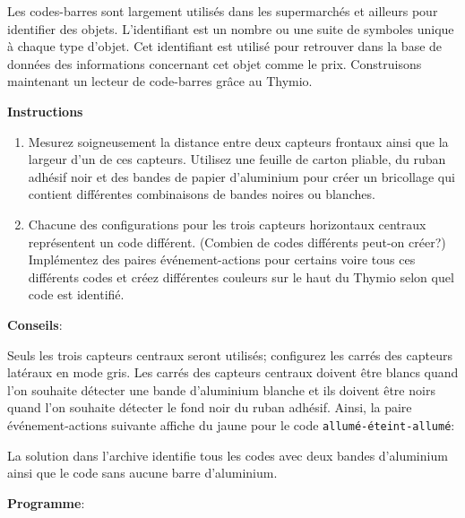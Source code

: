 \label{ch.barcode}

Les codes-barres sont largement utilisés dans les supermarchés et ailleurs pour identifier
des objets. L'identifiant est un nombre ou une suite de symboles unique à chaque type d'objet.
Cet identifiant est utilisé pour retrouver dans la base de données des informations concernant
cet objet comme le prix.
Construisons maintenant un lecteur de code-barres grâce au Thymio.

\textbf{Instructions}

\begin{enumerate}
\item Mesurez soigneusement la distance entre deux capteurs frontaux ainsi que la largeur d'un de ces
    capteurs.
    Utilisez une feuille de carton pliable, du ruban adhésif noir et des bandes de papier d'aluminium
    pour créer un bricollage qui contient différentes combinaisons de bandes noires ou blanches.

\begin{center}
\end{center}

\item Chacune des configurations pour les trois capteurs horizontaux centraux
    représentent un code différent. (Combien de codes différents peut-on créer?)
    Implémentez des paires événement-actions pour certains voire tous ces différents codes
    et créez différentes couleurs sur le haut du Thymio selon quel code est identifié.

\end{enumerate}

\textbf{Conseils}:

Seuls les trois capteurs centraux seront utilisés; configurez les carrés des capteurs latéraux
en mode gris.
Les carrés des capteurs centraux doivent être blancs quand l'on souhaite détecter une bande d'aluminium blanche
et ils doivent être noirs quand l'on souhaite détecter le fond noir du ruban adhésif.
Ainsi, la paire événement-actions suivante affiche du jaune pour le code \texttt{allumé-éteint-allumé}:


La solution dans l'archive identifie tous les codes avec deux bandes d'aluminium ainsi que 
le code sans aucune barre d'aluminium.

{\raggedleft \hfill \textbf{Programme}: }
